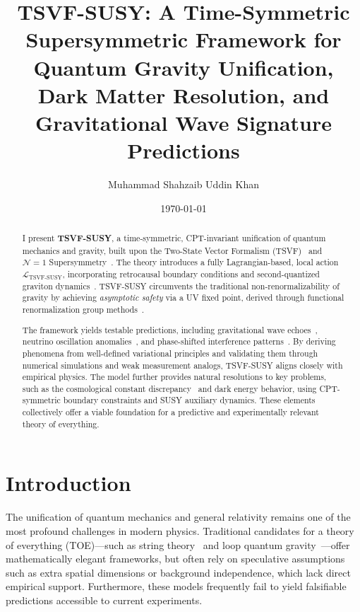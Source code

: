 \documentclass[twocolumn,superscriptaddress,floatfix]{revtex4-2}
\begin{document}
\title{TSVF-SUSY: A Time-Symmetric Supersymmetric Framework for Quantum Gravity Unification, Dark Matter Resolution, and Gravitational Wave Signature Predictions}

\author{Muhammad Shahzaib Uddin Khan}
\date{\today}

\begin{abstract}
I present \textbf{TSVF-SUSY}, a time-symmetric, CPT-invariant unification of quantum mechanics and gravity, built upon the Two-State Vector Formalism (TSVF)~\cite{Aharonov1964,Aharonov2008} and $\mathcal{N}=1$ Supersymmetry~\cite{Wess1992}. The theory introduces a fully Lagrangian-based, local action $\mathcal{L}_{\text{TSVF-SUSY}}$, incorporating retrocausal boundary conditions and second-quantized graviton dynamics~\cite{tsvf-susy-core}. TSVF-SUSY circumvents the traditional non-renormalizability of gravity by achieving \textit{asymptotic safety} via a UV fixed point, derived through functional renormalization group methods~\cite{Reuter1998}.

The framework yields testable predictions, including gravitational wave echoes~\cite{Abedi2017,tsvf-susy-gw}, neutrino oscillation anomalies~\cite{T2K2019,tsvf-susy-neutrinos}, and phase-shifted interference patterns~\cite{Danan2013,tsvf-susy-weak}. By deriving phenomena from well-defined variational principles and validating them through numerical simulations and weak measurement analogs, TSVF-SUSY aligns closely with empirical physics. The model further provides natural resolutions to key problems, such as the cosmological constant discrepancy~\cite{Weinberg1989} and dark energy behavior, using CPT-symmetric boundary constraints and SUSY auxiliary dynamics. These elements collectively offer a viable foundation for a predictive and experimentally relevant theory of everything.
\end{abstract}



\maketitle  


\section{Introduction}
\label{sec:intro}

The unification of quantum mechanics and general relativity remains one of the most profound challenges in modern physics. Traditional candidates for a theory of everything (TOE)—such as string theory~\cite{Polchinski1998a,Green1987} and loop quantum gravity~\cite{Rovelli2004}—offer mathematically elegant frameworks, but often rely on speculative assumptions such as extra spatial dimensions or background independence, which lack direct empirical support. Furthermore, these models frequently fail to yield falsifiable predictions accessible to current experiments.
\end{document}
